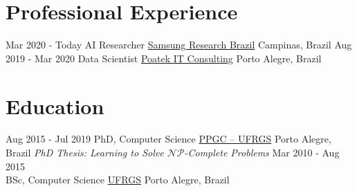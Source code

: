 \documentclass[letterpaper]{twentysecondcv} %
\begin{document}
\makeprofile %

\section{Professional Experience}

\begin{twenty} %
	\twentyitem
    	{Mar 2020 - Today}
        {AI Researcher}
        {\href{https://research.samsung.com/srbr}{Samsung Research Brazil}}
        {Campinas, Brazil}
        {}
	\twentyitem
    	{Aug 2019 - Mar 2020}
        {Data Scientist}
        {\href{http://www.poatek.com}{Poatek IT Consulting}}
        {Porto Alegre, Brazil}
        {}
\end{twenty}

\section{Education}

\begin{twenty} %
	\twentyitem
    	{Aug 2015 - Jul 2019}
        {PhD, Computer Science}
        {\href{http://www.inf.ufrgs.br/ppgc/en/}{PPGC -- UFRGS}}
        {Porto Alegre, Brazil}
        {\textit{PhD Thesis: Learning to Solve $\mathcal{NP}$-Complete Problems}}
	\twentyitem
    	{Mar 2010 - Aug 2015\\}
        {BSc, Computer Science}
        {\href{http://www.ufrgs.br/}{UFRGS}}
        {Porto Alegre, Brazil}
        {}
\end{twenty}

\vspace{-2em}
\end{document}
